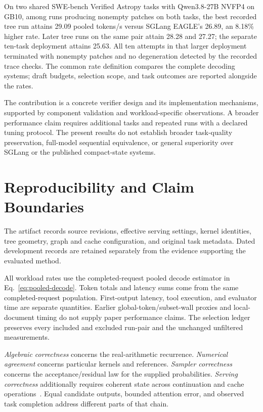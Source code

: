 \documentclass[conference]{IEEEtran}
\begin{document}
On two shared SWE-bench Verified Astropy tasks with Qwen3.8-27B NVFP4 on GB10, among runs producing nonempty patches on both tasks, the best recorded tree run attains 29.09 pooled tokens/s versus SGLang EAGLE's 26.89, an 8.18\% higher rate. Later tree runs on the same pair attain 28.28 and 27.27; the separate ten-task deployment attains 25.63. All ten attempts in that larger deployment terminated with nonempty patches and no degeneration detected by the recorded trace checks. The common rate definition compares the complete decoding systems; draft budgets, selection scope, and task outcomes are reported alongside the rates.

The contribution is a concrete verifier design and its implementation mechanisms, supported by component validation and workload-specific observations. A broader performance claim requires additional tasks and repeated runs with a declared tuning protocol. The present results do not establish broader task-quality preservation, full-model sequential equivalence, or general superiority over SGLang or the published compact-state systems.

\appendices
\section{Reproducibility and Claim Boundaries}
\label{app:audit}
The artifact records source revisions, effective serving settings, kernel identities, tree geometry, graph and cache configuration, and original task metadata. Dated development records are retained separately from the evidence supporting the evaluated method.

All workload rates use the completed-request pooled decode estimator in Eq.~\ref{eq:pooled-decode}. Token totals and latency sums come from the same completed-request population. First-output latency, tool execution, and evaluator time are separate quantities. Earlier global-token/subset-wall proxies and local-document timing do not supply paper performance claims. The selection ledger preserves every included and excluded run-pair and the unchanged unfiltered measurements.

\textit{Algebraic correctness} concerns the real-arithmetic recurrence. \textit{Numerical agreement} concerns particular kernels and references. \textit{Sampler correctness} concerns the acceptance/residual law for the supplied probabilities. \textit{Serving correctness} additionally requires coherent state across continuation and cache operations~\cite{yang2024delta,chen2023sampling,lumo2026archive}. Equal candidate outputs, bounded attention error, and observed task completion address different parts of that chain.
\end{document}

